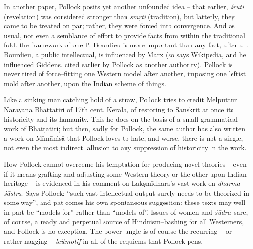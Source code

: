 {{In another paper, Pollock posits yet another unfounded idea – that earlier, \textit{śruti} (revelation) was considered stronger than \textit{smṛti} (tradition), but latterly, they came to be treated on par; rather, they were forced into convergence. And as usual, not even a semblance of effort to provide facts from within the traditional fold: the framework of one P. Bourdieu is more important than any fact, after all. Bourdieu, a public intellectual, is influenced by Marx (so says Wikipedia, and he influenced Giddens, cited earlier by Pollock as another authority). Pollock is never tired of force–fitting one Western model after another, imposing one leftist mold after another, upon the Indian scheme of things.

Like a sinking man catching hold of a straw, Pollock tries to credit Melputtūr Nārāyaṇa Bhaṭṭatiri of 17th cent. Kerala, of restoring to Sanskrit at once its historicity and its humanity. This he does on the basis of a small grammatical work of Bhaṭṭatiri; but then, sadly for Pollock, the same author has also written a work on Mīmāṁsā that Pollock loves to hate, and worse, there is not a single, not even the most indirect, allusion to any suppression of historicity in the work.

How Pollock cannot overcome his temptation for producing novel theories – even if it means grafting and adjusting some Western theory or the other upon Indian heritage – is evidenced in his comment on Lakṣmīdhara’s vast work on \textit{dharma–śāstra}. Says Pollock: “such vast intellectual output surely needs to be theorized in some way”, and pat comes his own spontaneous suggestion: these texts may well in part be “models for” rather than “models of”. Issues of women and \textit{śūdra}–s\break are, of course, a ready and perpetual source of Hinduism–bashing for all Westerners, and Pollock is no exception. The power–angle is of course the recurring – or rather nagging – \textit{leitmotif} in all of the requiems that Pollock pens.

}}
